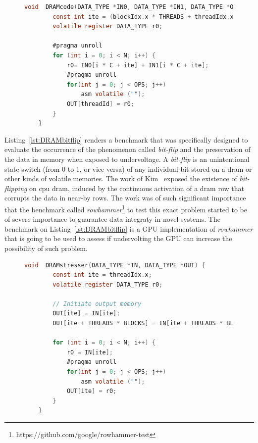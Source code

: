 \begin{figure}[h]
    \begin{lstlisting}[language=C, caption=DRAM Benchmark Code, label=lst:DRAMbench, basicstyle=\footnotesize\ttfamily,abovecaptionskip=0pt, captionpos=b]
    void  DRAMcode(DATA_TYPE *IN0, DATA_TYPE *IN1, DATA_TYPE *OUT) {
        const int ite = (blockIdx.x * THREADS + threadIdx.x) % MEM_BLOCK;
        volatile register DATA_TYPE r0;
        
        #pragma unroll
        for (int i = 0; i < N; i++) {
            r0= IN0[i * C + ite] + IN1[i * C + ite];
            #pragma unroll
            for(int j = 0; j < OPS; j++)  
                asm volatile ("");
            OUT[threadId] = r0;
        }
    }
    \end{lstlisting}
\end{figure}

Listing~\ref{lst:DRAMbitflip} renders a benchmark that was specifically designed to evaluate the occurrence of the phenomenon called \textit{bit-flip} and the preservation of the data in memory when exposed to undervoltage. A \textit{bit-flip} is an unintentional state switch (from 0 to 1, or vice versa) of any individual bit stored on a \acrshort{dram} or other kinds of volatile memories. The work of Kim~\cite{kim_flipping_2014} exposed the existence of \textit{bit-flipping} on \acrshort{cpu} \acrshort{dram}, induced by the continuous activation of a \acrshort{dram} row that corrupts the data in near-by rows. The work was of such significant importance that the benchmark called \textit{rowhammer}\footnote{https://github.com/google/rowhammer-test} to test this exact problem started to be of severe importance to guarantee data integraty in novel systems. The benchmark on Listing~\ref{lst:DRAMbitflip} is a GPU implementation of \textit{rowhammer} that is going to be used to assess if undervolting the GPU can increase the possibility of such problem.

\begin{figure}[h]
    \begin{lstlisting}[language=C, caption=DRAM Bit-Flip Stress Test Code - \textit{rowhammer} inspired  benchmark, label=lst:DRAMbitflip, basicstyle=\footnotesize\ttfamily,abovecaptionskip=0pt, captionpos=b]
    void  DRAMstresser(DATA_TYPE *IN, DATA_TYPE *OUT) {
        const int ite = threadIdx.x;
        volatile register DATA_TYPE r0;
        
        // Initiate output memory
        OUT[ite] = IN[ite];
        OUT[ite + THREADS * BLOCKS] = IN[ite + THREADS * BLOCKS];
        
        for (int i = 0; i < N; i++) {
            r0 = IN[ite];
            #pragma unroll
            for(int j = 0; j < OPS; j++)  
                asm volatile ("");
            OUT[ite] = r0;
        }
    }
    \end{lstlisting}
\end{figure}


